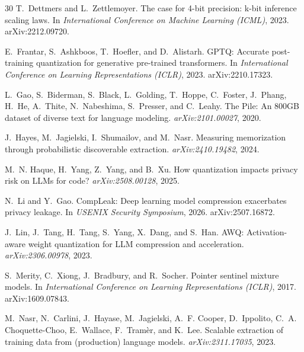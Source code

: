 \documentclass{article}
\begin{document}
\begin{thebibliography}{30}
T.~Dettmers and L.~Zettlemoyer.
\newblock The case for 4-bit precision: k-bit inference scaling laws.
\newblock In \emph{International Conference on Machine Learning (ICML)}, 2023.
  arXiv:2212.09720.

E.~Frantar, S.~Ashkboos, T.~Hoefler, and D.~Alistarh.
\newblock GPTQ: Accurate post-training quantization for generative
  pre-trained transformers.
\newblock In \emph{International Conference on Learning Representations
  (ICLR)}, 2023. arXiv:2210.17323.

L.~Gao, S.~Biderman, S.~Black, L.~Golding, T.~Hoppe, C.~Foster, J.~Phang,
  H.~He, A.~Thite, N.~Nabeshima, S.~Presser, and C.~Leahy.
\newblock The Pile: An 800GB dataset of diverse text for language modeling.
\newblock \emph{arXiv:2101.00027}, 2020.

J.~Hayes, M.~Jagielski, I.~Shumailov, and M.~Nasr.
\newblock Measuring memorization through probabilistic discoverable
  extraction.
\newblock \emph{arXiv:2410.19482}, 2024.

M.~N. Haque, H.~Yang, Z.~Yang, and B.~Xu.
\newblock How quantization impacts privacy risk on LLMs for code?
\newblock \emph{arXiv:2508.00128}, 2025.

N.~Li and Y.~Gao.
\newblock CompLeak: Deep learning model compression exacerbates privacy
  leakage.
\newblock In \emph{USENIX Security Symposium}, 2026. arXiv:2507.16872.

J.~Lin, J.~Tang, H.~Tang, S.~Yang, X.~Dang, and S.~Han.
\newblock AWQ: Activation-aware weight quantization for LLM compression and
  acceleration.
\newblock \emph{arXiv:2306.00978}, 2023.

S.~Merity, C.~Xiong, J.~Bradbury, and R.~Socher.
\newblock Pointer sentinel mixture models.
\newblock In \emph{International Conference on Learning Representations
  (ICLR)}, 2017. arXiv:1609.07843.

M.~Nasr, N.~Carlini, J.~Hayase, M.~Jagielski, A.~F. Cooper, D.~Ippolito,
  C.~A. Choquette-Choo, E.~Wallace, F.~Tram\`er, and K.~Lee.
\newblock Scalable extraction of training data from (production) language
  models.
\newblock \emph{arXiv:2311.17035}, 2023.


\end{thebibliography}
\end{document}
